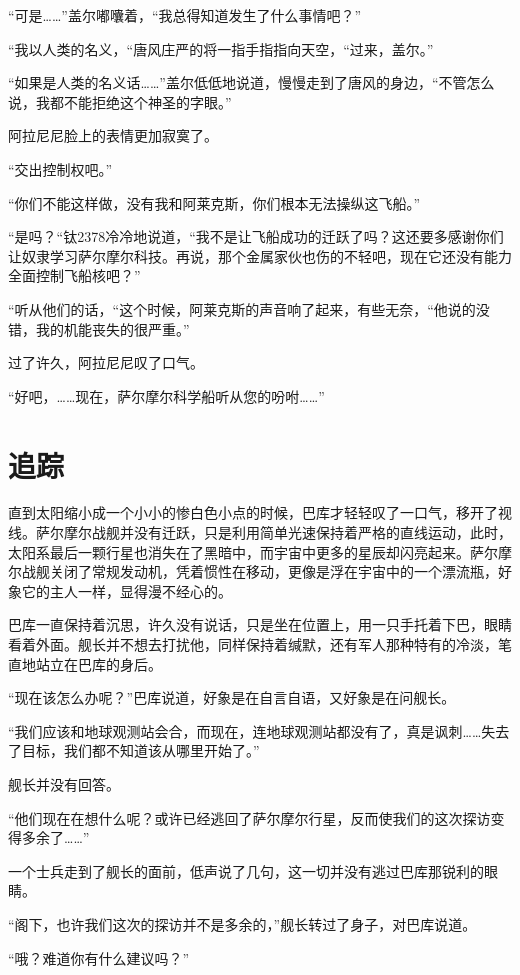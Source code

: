 “可是……”盖尔嘟囔着，“我总得知道发生了什么事情吧？” 

“我以人类的名义，“唐风庄严的将一指手指指向天空，“过来，盖尔。” 

“如果是人类的名义话……”盖尔低低地说道，慢慢走到了唐风的身边，“不管怎么说，我都不能拒绝这个神圣的字眼。” 

阿拉尼尼脸上的表情更加寂寞了。 

“交出控制权吧。” 

“你们不能这样做，没有我和阿莱克斯，你们根本无法操纵这飞船。” 

“是吗？“钛2378冷冷地说道，“我不是让飞船成功的迁跃了吗？这还要多感谢你们让奴隶学习萨尔摩尔科技。再说，那个金属家伙也伤的不轻吧，现在它还没有能力全面控制飞船核吧？” 

“听从他们的话，“这个时候，阿莱克斯的声音响了起来，有些无奈，“他说的没错，我的机能丧失的很严重。” 

过了许久，阿拉尼尼叹了口气。 

“好吧，……现在，萨尔摩尔科学船听从您的吩咐……” 

\chapter{追踪}

直到太阳缩小成一个小小的惨白色小点的时候，巴库才轻轻叹了一口气，移开了视线。萨尔摩尔战舰并没有迁跃，只是利用简单光速保持着严格的直线运动，此时，太阳系最后一颗行星也消失在了黑暗中，而宇宙中更多的星辰却闪亮起来。萨尔摩尔战舰关闭了常规发动机，凭着惯性在移动，更像是浮在宇宙中的一个漂流瓶，好象它的主人一样，显得漫不经心的。 

巴库一直保持着沉思，许久没有说话，只是坐在位置上，用一只手托着下巴，眼睛看着外面。舰长并不想去打扰他，同样保持着缄默，还有军人那种特有的冷淡，笔直地站立在巴库的身后。 

“现在该怎么办呢？”巴库说道，好象是在自言自语，又好象是在问舰长。 

“我们应该和地球观测站会合，而现在，连地球观测站都没有了，真是讽刺……失去了目标，我们都不知道该从哪里开始了。” 

舰长并没有回答。 

“他们现在在想什么呢？或许已经逃回了萨尔摩尔行星，反而使我们的这次探访变得多余了……” 

一个士兵走到了舰长的面前，低声说了几句，这一切并没有逃过巴库那锐利的眼睛。 

“阁下，也许我们这次的探访并不是多余的，”舰长转过了身子，对巴库说道。 

“哦？难道你有什么建议吗？” 

